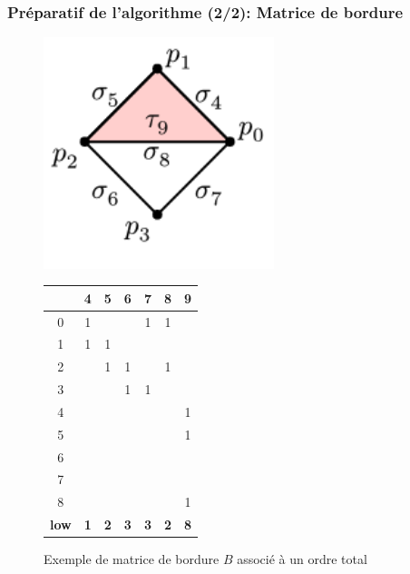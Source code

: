 \documentclass{beamer}
\begin{document}
\begin{frame}
    \frametitle{Préparatif de l'algorithme (2/2): Matrice de bordure}
    \fontsize{8}{10}\selectfont
    \begin{figure}[h]
        \centering
        \begin{minipage}[c]{0.45\linewidth}
            \centering
            \includegraphics[width=0.6\textwidth]{"../images/notationSimplexe.png"} 
        \end{minipage}
        \hfill
        \begin{tabular}{ c | c | c | c | c | c | c }
                & 4 & 5 & 6 & 7 & 8 & 9 \\ \hline
            0   & 1 &   &   & 1 & 1 &   \\ \hline
            1   & 1 & 1 &   &   &   &   \\ \hline
            2   &   & 1 & 1 &   & 1 &   \\ \hline
            3   &   &   & 1 & 1 &   &   \\ \hline
            4   &   &   &   &   &   & 1 \\ \hline
            5   &   &   &   &   &   & 1 \\ \hline
            6   &   &   &   &   &   &   \\ \hline
            7   &   &   &   &   &   &   \\ \hline
            8   &   &   &   &   &   & 1 \\ \hline
            \textbf{low} & \textbf{1} & \textbf{2} & \textbf{3} & 
            \textbf{3} & \textbf{2} & \textbf{8}
        \end{tabular}
        
        \caption{Exemple de matrice de bordure $B$ associé à un ordre total}
    \end{figure}
\end{frame}
\end{document}
